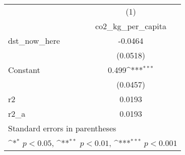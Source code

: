 {
\def\sym#1{\ifmmode^{#1}\else\(^{#1}\)\fi}
\begin{tabular}{l*{1}{c}}
\hline\hline
                    &\multicolumn{1}{c}{(1)}\\
                    &\multicolumn{1}{c}{co2\_kg\_per\_capita}\\
\hline
dst\_now\_here        &     -0.0464         \\
                    &    (0.0518)         \\
[1em]
Constant            &       0.499\sym{***}\\
                    &    (0.0457)         \\
\hline
r2                  &      0.0193         \\
r2\_a                &      0.0193         \\
\hline\hline
\multicolumn{2}{l}{\footnotesize Standard errors in parentheses}\\
\multicolumn{2}{l}{\footnotesize \sym{*} \(p<0.05\), \sym{**} \(p<0.01\), \sym{***} \(p<0.001\)}\\
\end{tabular}
}
